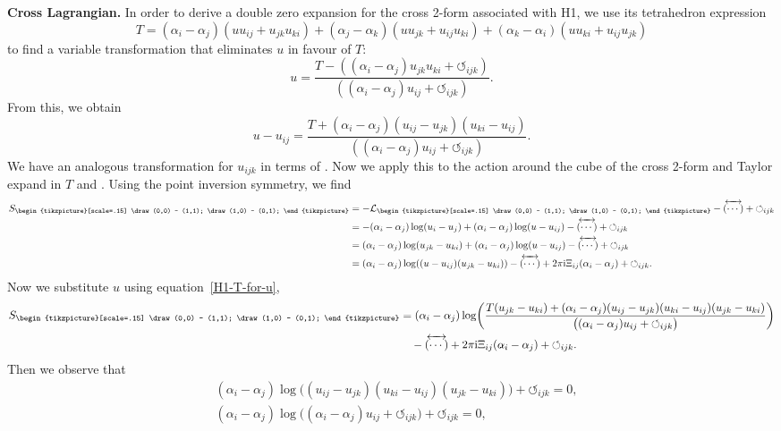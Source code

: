 \documentclass[pdftex]{sigma}
\newcommand{\inversion}[1]{\!\overleftrightarrow{\,#1\,}\!}
\newcommand{\reverse}{{\,\overleftrightarrow{\!(\cdots)\!}\,}}
\newcommand{\cross}{{\begin{tikzpicture}[scale=.15]
			\draw (0,0) -- (1,1);
			\draw (1,0) -- (0,1);
\end{tikzpicture}}}
\newcommand{\cyclic}{{\circlearrowleft}_{ijk}}
\newcommand{\cL}{\mathcal{L}}
\numberwithin{equation}{section}
\begin{document}
{\bf Cross Lagrangian.}
In order to derive a double zero expansion for the cross 2-form associated with H1, we use its tetrahedron expression
\[ T = (\alpha_i-\alpha_j)(u u_{ij} + u_{jk}u_{ki})
+ (\alpha_j-\alpha_k)(u u_{jk} + u_{ij} u_{ki})
+ (\alpha_k-\alpha_i)(u u_{ki} + u_{ij} u_{jk} ) \]
to find a variable transformation that eliminates $u$ in favour of $T$:
\[
 u = \frac{T - ( (\alpha_i-\alpha_j) u_{jk} u_{ki} + \cyclic ) }{( (\alpha_i - \alpha_j) u_{ij} + \cyclic ) } .
\]
From this, we obtain
\begin{equation}
 \label{H1-T-for-u}
 u - u_{ij} = \frac{T + (\alpha_i-\alpha_j) (u_{ij} - u_{jk})(u_{ki} - u_{ij}) }{( (\alpha_i - \alpha_j) u_{ij} + \cyclic ) } .
\end{equation}
We have an analogous transformation for $u_{ijk}$ in terms of \smash{$\inversion T$}. Now we apply this to the action around the cube of the cross 2-form and Taylor expand in $T$ and \smash{$\inversion T$}.
Using the point inversion symmetry, we find
\begin{align*}
\begin{split}
 S_\cross
 & = -\cL_\cross -\reverse + \cyclic \\
 &= -(\alpha_i - \alpha_j) \log(u_i - u_j) + (\alpha_i - \alpha_j) \log(u - u_{ij}) -\reverse + \cyclic \\
 &= (\alpha_i - \alpha_j) \log(u_{jk} - u_{ki}) + (\alpha_i - \alpha_j) \log(u - u_{ij}) -\reverse + \cyclic \\
 &= (\alpha_i - \alpha_j) \log ((u - u_{ij})(u_{jk} - u_{ki})) - \reverse + 2 \pi {\rm i} \Xi_{ij} (\alpha_i-\alpha_j) + \cyclic .
 \end{split}
\end{align*}
Now we substitute $u$ using equation~\eqref{H1-T-for-u},
\begin{align*}
 S_\cross &= (\alpha_i - \alpha_j) \log \biggl( \frac{T(u_{jk} - u_{ki}) + (\alpha_i-\alpha_j) (u_{ij} - u_{jk})(u_{ki} - u_{ij})(u_{jk} - u_{ki}) }{\bigl( (\alpha_i - \alpha_j) u_{ij} + \cyclic \bigr) } \biggr) \\
 &\quad{}- \reverse + 2 \pi {\rm i} \Xi_{ij} (\alpha_i-\alpha_j) + \cyclic .
\end{align*}
Then we observe that
\begin{align*}
& (\alpha_i - \alpha_j) \log \bigl( (u_{ij} - u_{jk})(u_{ki} - u_{ij})(u_{jk} - u_{ki}) \bigr) + \cyclic= 0 , \\
& (\alpha_i - \alpha_j) \log \bigl( (\alpha_i - \alpha_j) u_{ij} + \cyclic \bigr) + \cyclic= 0 ,
\end{align*}
\end{document}
